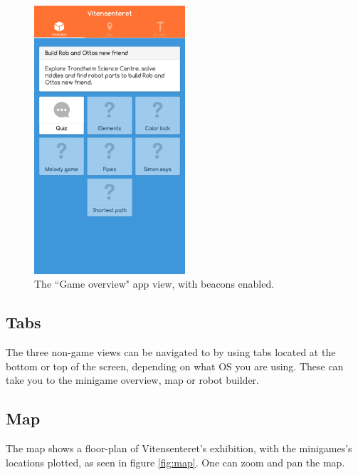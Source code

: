 \begin{figure}[H]
    \centering
    \includegraphics[width=0.5\textwidth]{images/app/overview_beacons.png}
    \caption{The ``Game overview" app view, with beacons enabled.}
    \label{fig:overview_beacons}
\end{figure}


\subsection{Tabs}
The three non-game views can be navigated to by using tabs located at the bottom or top of the screen, depending on what OS you are using. These can take you to the minigame overview, map or robot builder.

\subsection{Map}
The map shows a floor-plan of Vitensenteret's exhibition, with the minigames's locations plotted, as seen in figure \ref{fig:map}. One can zoom and pan the map.


